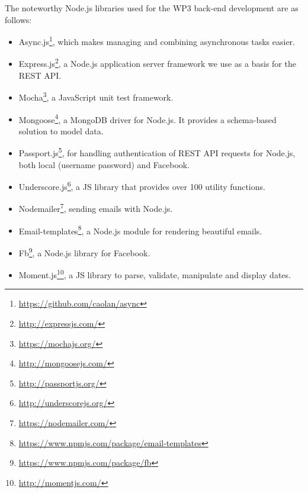 The noteworthy Node.js libraries used for the WP3 back-end development are as follows:

\begin{itemize}

\item Async.js\footnote{\url{https://github.com/caolan/async}}, which makes managing and combining asynchronous tasks easier. 

\item Express.js\footnote{\url{http://expressjs.com/}}, a Node.js application server framework we use as a basis for the REST API. 

\item Mocha\footnote{\url{https://mochajs.org/}}, a JavaScript unit test framework. 

\item Mongoose\footnote{\url{http://mongoosejs.com/}}, a MongoDB driver for Node.js. It provides a schema-based solution to model data. 

\item Passport.js\footnote{\url{http://passportjs.org/}}, for handling authentication of REST API requests for Node.js, both local (username password) and Facebook. 

\item Underscore.js\footnote{\url{http://underscorejs.org/}}, a JS library that provides over 100 utility functions. 

\item Nodemailer\footnote{\url{https://nodemailer.com/}}, sending emails with Node.js.

\item Email-templates\footnote{\url{https://www.npmjs.com/package/email-templates}}, a Node.js module for rendering beautiful emails.

\item Fb\footnote{\url{https://www.npmjs.com/package/fb}}, a Node.js library for Facebook.

\item Moment.js\footnote{\url{http://momentjs.com/}}, a JS library to parse, validate, manipulate and display dates. 


\end{itemize}
